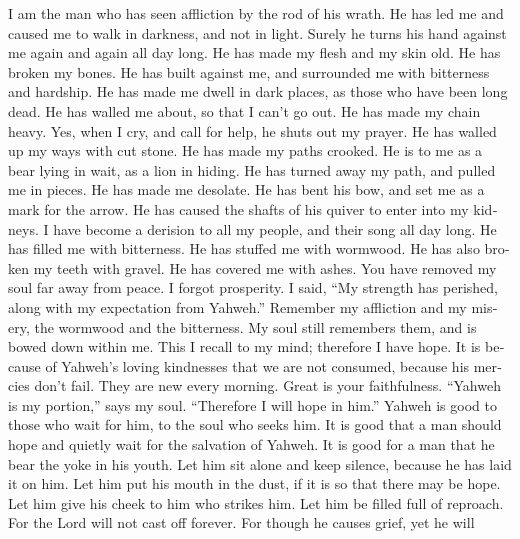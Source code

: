 \begin{paracol}{2}
\begin{otherlanguage}{english}
 I am the man who has seen affliction by the rod of his
wrath.  He has led me and caused me to walk in darkness,
and not in light.  Surely he turns his hand against me
again and again all day long.  He has made my flesh and my
skin old. He has broken my bones.  He has built against
me, and surrounded me with bitterness and hardship.  He
has made me dwell in dark places, as those who have been long dead.
 He has walled me about, so that I can't go out. He has
made my chain heavy.  Yes, when I cry, and call for help,
he shuts out my prayer.  He has walled up my ways with cut
stone. He has made my paths crooked.  He is to me as a
bear lying in wait, as a lion in hiding.  He has turned
away my path, and pulled me in pieces. He has made me desolate.
 He has bent his bow, and set me as a mark for the arrow.
 He has caused the shafts of his quiver to enter into my
kidneys.  I have become a derision to all my people, and
their song all day long.  He has filled me with
bitterness. He has stuffed me with wormwood.  He has also
broken my teeth with gravel. He has covered me with ashes.
 You have removed my soul far away from peace. I forgot
prosperity.  I said, ``My strength has perished, along
with my expectation from Yahweh.''  Remember my
affliction and my misery, the wormwood and the bitterness.
 My soul still remembers them, and is bowed down within
me.  This I recall to my mind; therefore I have hope.
 It is because of Yahweh's loving kindnesses that we are
not consumed, because his mercies don't fail.  They are
new every morning. Great is your faithfulness.  ``Yahweh
is my portion,'' says my soul. ``Therefore I will hope in him.''
 Yahweh is good to those who wait for him, to the soul
who seeks him.  It is good that a man should hope and
quietly wait for the salvation of Yahweh.  It is good for
a man that he bear the yoke in his youth.  Let him sit
alone and keep silence, because he has laid it on him. 
Let him put his mouth in the dust, if it is so that there may be hope.
 Let him give his cheek to him who strikes him. Let him
be filled full of reproach.  For the Lord will not cast
off forever.  For though he causes grief, yet he will

\end{otherlanguage}
\end{paracol}
